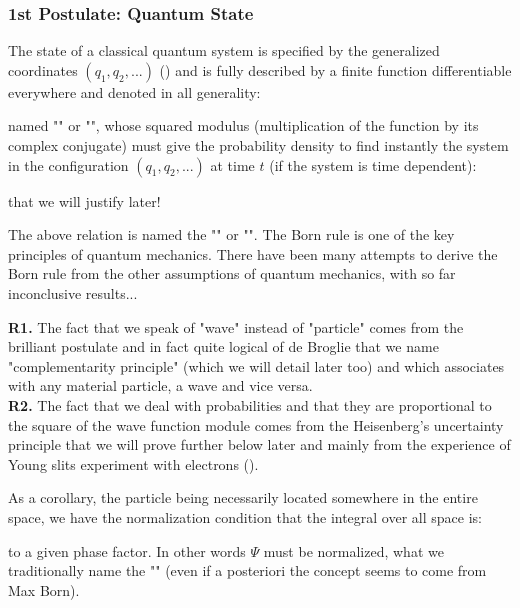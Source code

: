	\subsubsection{1st Postulate: Quantum State}\label{first postulate wave quantum physics}
	The state of a classical quantum system is specified by the generalized coordinates $(q_1,q_2,...)$ () and is fully described by a finite function differentiable everywhere and denoted in all generality:
	
	named "" or "", whose squared modulus (multiplication of the function by its complex conjugate) must give the probability density to find instantly the system in the configuration $(q_1,q_2,...)$ at time $t$ (if the system is time dependent):
	
	that we will justify later!
	
	The above relation is named the "" or "". The Born rule is one of the key principles of quantum mechanics. There have been many attempts to derive the Born rule from the other assumptions of quantum mechanics, with so far inconclusive results...
	
	\begin{tcolorbox}[title=Remarks,colframe=black,arc=10pt]
	\textbf{R1.} The fact that we speak of "wave" instead of "particle" comes from the brilliant postulate and in fact quite logical of de Broglie that we name "complementarity principle" (which we will detail later too) and which associates with any material particle, a wave and vice versa.\\
	
	\textbf{R2.} The fact that we deal with probabilities and that they are proportional to the square of the wave function module comes from the Heisenberg's uncertainty principle that we will prove further below later and mainly from the experience of Young slits experiment with electrons ().
	\end{tcolorbox}
	As a corollary, the particle being necessarily located somewhere in the entire space, we have the normalization condition that the integral over all space is:
	
	to a given phase factor. In other words $\Psi$ must be normalized, what we traditionally name the "\label{de broglie normalization condition}" (even if a posteriori the concept seems to come from Max Born).
	
